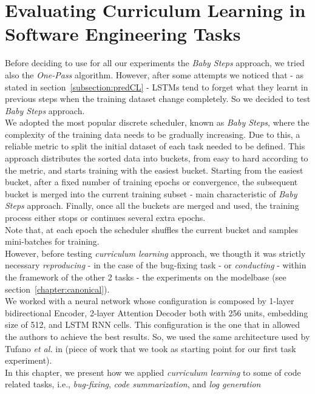 \chapter{Evaluating Curriculum Learning in Software Engineering Tasks}
\label{chapter:chap4}
Before deciding to use for all our experiments the \textit{Baby Steps} approach, we 
tried also the \textit{One-Pass} algorithm. However, after some attempts we noticed that - as 
stated in section~\ref{subsection:predCL} - LSTMs tend to forget what they learnt in previous steps when the training dataset 
change completely. So we decided to test \textit{Baby Steps} approach.\\
We adopted the most popular discrete scheduler, known as \textit{Baby Steps}, where the complexity of the training
data needs to be gradually increasing. Due to this, a reliable metric to split the initial dataset of each task needed to be defined.
This approach distributes the sorted data into buckets, from easy to hard according to the metric, and starts training with the easiest bucket. 
Starting from the easiest bucket, after a fixed number of training epochs or convergence, the subsequent bucket is merged
into the current training subset - main characteristic of \textit{Baby Steps} approach.
Finally, once all the buckets are merged and used, the
training process either stops or continues several extra epochs.\\
Note that, at each epoch the scheduler shuffles the current bucket and samples mini-batches for training.\\
\newline
However, before testing \textit{curriculum learning} approach, we thougth it was strictly necessary \textit{reproducing} - in the case 
of the bug-fixing task - or \textit{conducting} -  within the framework of the other 2 tasks - the experiments on the modelbase (see section~\ref{chapter:canonical}).\\
We worked with a neural network whose configuration is composed by 1-layer bidirectional Encoder, 2-layer Attention 
Decoder both with 256 units, embedding size of 512, and LSTM RNN cells. This configuration is the one that in 
\cite{Tufano2019} allowed the authors to achieve the best results. So, we used the same architecture 
used by Tufano \textit{et al.} in \cite{Tufano2019} (piece of work that we took as starting point 
for our first task experiment).\\
\newline
In this chapter, we present how we applied \textit{curriculum learning} to some of code related tasks, i.e., \textit{bug-fixing}, \textit{code summarization}, and \textit{log generation}

